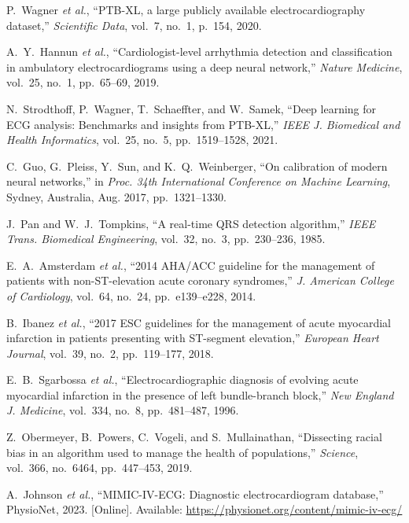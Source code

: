 \documentclass[journal]{IEEEtran}
\begin{document}
\begin{thebibliography}{10}

P.~Wagner \textit{et al.}, ``PTB-XL, a large publicly available electrocardiography dataset,'' \textit{Scientific Data}, vol.~7, no.~1, p.~154, 2020.

A.~Y.~Hannun \textit{et al.}, ``Cardiologist-level arrhythmia detection and classification in ambulatory electrocardiograms using a deep neural network,'' \textit{Nature Medicine}, vol.~25, no.~1, pp.~65--69, 2019.

N.~Strodthoff, P.~Wagner, T.~Schaeffter, and W.~Samek, ``Deep learning for ECG analysis: Benchmarks and insights from PTB-XL,'' \textit{IEEE J. Biomedical and Health Informatics}, vol.~25, no.~5, pp.~1519--1528, 2021.

C.~Guo, G.~Pleiss, Y.~Sun, and K.~Q.~Weinberger, ``On calibration of modern neural networks,'' in \textit{Proc. 34th International Conference on Machine Learning}, Sydney, Australia, Aug. 2017, pp.~1321--1330.

J.~Pan and W.~J.~Tompkins, ``A real-time QRS detection algorithm,'' \textit{IEEE Trans. Biomedical Engineering}, vol.~32, no.~3, pp.~230--236, 1985.

E.~A.~Amsterdam \textit{et al.}, ``2014 AHA/ACC guideline for the management of patients with non-ST-elevation acute coronary syndromes,'' \textit{J. American College of Cardiology}, vol.~64, no.~24, pp.~e139--e228, 2014.

B.~Ibanez \textit{et al.}, ``2017 ESC guidelines for the management of acute myocardial infarction in patients presenting with ST-segment elevation,'' \textit{European Heart Journal}, vol.~39, no.~2, pp.~119--177, 2018.

E.~B.~Sgarbossa \textit{et al.}, ``Electrocardiographic diagnosis of evolving acute myocardial infarction in the presence of left bundle-branch block,'' \textit{New England J. Medicine}, vol.~334, no.~8, pp.~481--487, 1996.

Z.~Obermeyer, B.~Powers, C.~Vogeli, and S.~Mullainathan, ``Dissecting racial bias in an algorithm used to manage the health of populations,'' \textit{Science}, vol.~366, no.~6464, pp.~447--453, 2019.

A.~Johnson \textit{et al.}, ``MIMIC-IV-ECG: Diagnostic electrocardiogram database,'' PhysioNet, 2023. [Online]. Available: \url{https://physionet.org/content/mimic-iv-ecg/}


\end{thebibliography}
\end{document}
